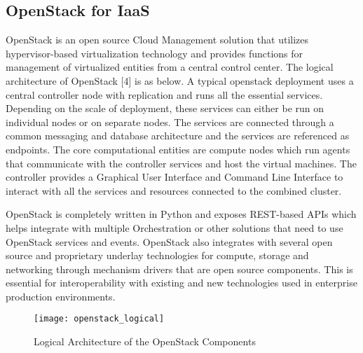 \subsection{OpenStack for IaaS}

OpenStack is an open source Cloud Management solution that utilizes hypervisor-based virtualization technology and provides functions for management of virtualized entities from a central control center. The logical architecture of OpenStack [4] is as below. A typical openstack deployment uses a central controller node with replication and runs all the essential services. Depending on the scale of deployment, these services can either be run on individual nodes or on separate nodes. The services are connected through a common messaging and database architecture and the services are referenced as endpoints. The core computational entities are compute nodes which run agents that communicate with the controller services and host the virtual machines. The controller provides a Graphical User Interface and Command Line Interface to interact with all the services and resources connected to the combined cluster. 

OpenStack is completely written in Python and exposes REST-based APIs which helps integrate with multiple Orchestration or other solutions that need to use OpenStack services and events. OpenStack also integrates with several open source and proprietary underlay technologies for compute, storage and networking through mechanism drivers that are open source components. This is essential for interoperability with existing and new technologies used in enterprise production environments.

\begin{figure}
    \centering
    \texttt{[image: openstack\_logical]}
    \label{fig:figure11}
    \caption{Logical Architecture of the OpenStack Components}
\end{figure}


